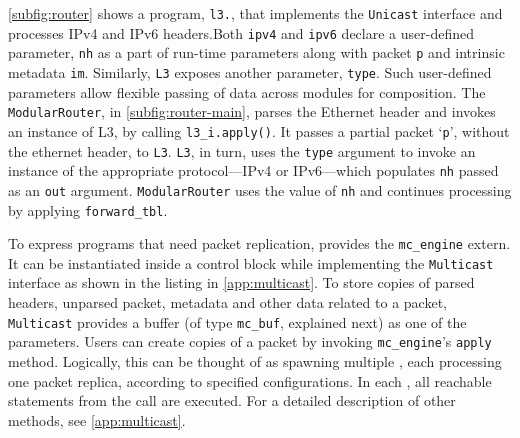 \documentclass[letterpaper,twocolumn,10pt]{article}
\begin{document}

 \cref{subfig:router} shows a program, \texttt{l3.\ulang},
that implements the \texttt{Unicast} interface and processes IPv4 and
IPv6 headers.\footnotemark[\value{footnote}] Both \texttt{ipv4} and
\texttt{ipv6} declare a user-defined parameter, \texttt{nh} as a part
of run-time parameters along with packet \texttt{p} and intrinsic
metadata \texttt{im}. Similarly, \texttt{L3} exposes another
parameter, \texttt{type}. Such user-defined parameters allow flexible
passing of data across modules for composition. The
\texttt{ModularRouter}, in \cref{subfig:router-main}, parses the
Ethernet header and invokes an instance of L3, by calling
\texttt{l3\_i.apply()}. It passes a partial packet `\texttt{p}',
without the ethernet header, to \texttt{L3}. \texttt{L3}, in turn,
uses the \texttt{type} argument to invoke an instance of the
appropriate protocol---IPv4 or IPv6---which populates \texttt{nh}
passed as an \texttt{out} argument. \texttt{ModularRouter} uses the
value of \texttt{nh} and continues processing by applying
\texttt{forward\_tbl}.







To express programs that need packet replication, \uarch provides the
\texttt{mc\_engine} extern. It can be instantiated inside a control
block while implementing the \texttt{Multicast} interface as shown in
the listing in \cref{app:multicast}.  To store copies of parsed
headers, unparsed packet, metadata and other data related to a packet,
\texttt{Multicast} provides a buffer (of type \texttt{mc\_buf},
explained next) as one of the parameters.  Users can create copies of
a packet by invoking \texttt{mc\_engine}'s \texttt{apply} method.
Logically, this can be thought of as spawning multiple \upipelines,
each processing one packet replica, according to specified
configurations. In each \upipeline, all reachable statements from the
call are executed.
For a detailed description of other methods, see \cref{app:multicast}.

\end{document}
